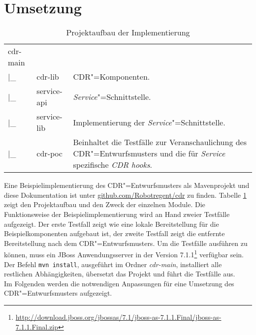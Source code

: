 \section{Umsetzung\label{sec:implementation}}
\begin{table}
\caption{\label{tab:project}Projektaufbau der Implementierung}
\begin{tabular}{lp{2cm}p{8cm}}
cdr-main &             & \\
|\_      & cdr-lib     & \ac{CDR}"=Komponenten.\\
|\_      & service-api & \textit{Service}"=Schnittstelle.\\
|\_      & service-lib & Implementierung der \textit{Service}"=Schnittstelle.\\
|\_      & cdr-poc     & Beinhaltet die Testfälle zur Veranschaulichung des \ac{CDR}"=Entwurfsmusters und die für \textit{Service} spezifische \textit{CDR hooks}.\\
\end{tabular}
\end{table}
Eine Beispielimplementierung des \ac{CDR}"=Entwurfsmusters als Mavenprojekt und diese Dokumentation ist unter \href{https://github.com/Robotregent/cdr}{github.com/Robotregent/cdr} zu finden. 
Tabelle \ref{tab:project} zeigt den Projektaufbau und den Zweck der einzelnen Module.
Die Funktionsweise der Beispielimplementierung wird an Hand zweier Testfälle aufgezeigt. Der erste Testfall zeigt wie eine lokale Bereitstellung für die Beispielkomponenten aufgebaut ist, der zweite Testfall zeigt die entfernte Bereitstellung nach dem \ac{CDR}"=Entwurfsmusters.
Um die Testfälle ausführen zu können, muss ein JBoss Anwendungsserver in der Version 7.1.1\footnote{\href{http://download.jboss.org/jbossas/7.1/jboss-as-7.1.1.Final/jboss-as-7.1.1.Final.zip}{{http://download.jboss.org/jbossas/7.1/jboss-as-7.1.1.Final/jboss-as-7.1.1.Final.zip}}} verfügbar sein.  
Der Befehl \colorbox{mygray}{\lstinline!mvn install!}, ausgeführt im Ordner \textit{cdr-main}, installiert alle restlichen Abhängigkeiten, übersetzt das Projekt und führt die Testfälle aus.\\
Im Folgenden werden die notwendigen Anpassungen für eine Umsetzung des \ac{CDR}"=Entwurfsmusters aufgezeigt.

